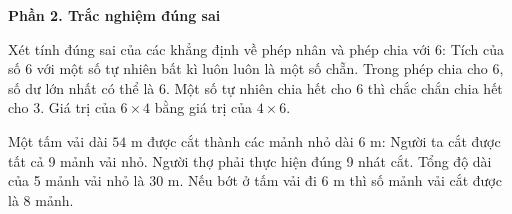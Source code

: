 \textbf{Phần 2. Trắc nghiệm đúng sai}

\begin{ex} %
Xét tính đúng sai của các khẳng định về phép nhân và phép chia với 6:
\choiceTF
{\True Tích của số 6 với một số tự nhiên bất kì luôn luôn là một số chẵn.}
{Trong phép chia cho 6, số dư lớn nhất có thể là 6.}
{\True Một số tự nhiên chia hết cho 6 thì chắc chắn chia hết cho 3.}
{\True Giá trị của $6 \times 4$ bằng giá trị của $4 \times 6$.}
\end{ex}

\begin{ex} %
Một tấm vải dài $54\text{ m}$ được cắt thành các mảnh nhỏ dài $6\text{ m}$:
\choiceTF
{\True Người ta cắt được tất cả 9 mảnh vải nhỏ.}
{Người thợ phải thực hiện đúng 9 nhát cắt.}
{\True Tổng độ dài của 5 mảnh vải nhỏ là $30\text{ m}$.}
{\True Nếu bớt ở tấm vải đi $6\text{ m}$ thì số mảnh vải cắt được là 8 mảnh.}
\end{ex}

